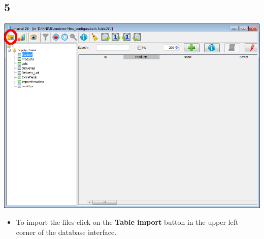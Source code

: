 \documentclass{beamer}
\begin{document}
\subsection{5}
\begin{frame}
	\begin{center}
  		\includegraphics[height=0.6\textheight]{5.png}
	\end{center}
	\begin{itemize}
		\item To import the files click on the \textbf{Table import} button in the upper left corner of the database interface.
	\end{itemize}
\end{frame}
\end{document}
